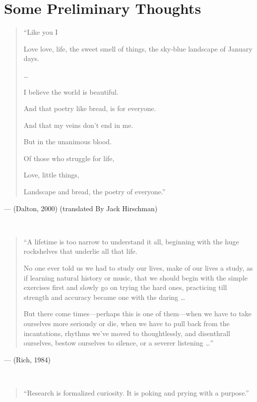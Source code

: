 \documentclass[
  letterpaper,
  DIV=11,
  numbers=noendperiod]{scrreprt}
\begin{document}

\hypertarget{some-preliminary-thoughts}{%
\chapter*{Some Preliminary Thoughts}\label{some-preliminary-thoughts}}


\begin{quote}
``Like you I

Love love, life, the sweet smell of things, the sky-blue landscape of
January days.

\ldots{}

I believe the world is beautiful.

And that poetry like bread, is for everyone.

And that my veins don't end in me.

But in the unanimous blood.

Of those who struggle for life,

Love, little things,

Landscape and bread, the poetry of everyone.''
\end{quote}

--- (Dalton, 2000) (translated By Jack Hirschman)

\(~\)

\begin{quote}
``A lifetime is too narrow to understand it all, beginning with the huge
rockshelves that underlie all that life.

No one ever told us we had to study our lives, make of our lives a
study, as if learning natural history or music, that we should begin
with the simple exercises first and slowly go on trying the hard ones,
practicing till strength and accuracy became one with the daring
\ldots{}

But there come times---perhaps this is one of them---when we have to
take ourselves more seriously or die, when we have to pull back from the
incantations, rhythms we've moved to thoughtlessly, and disenthrall
ourselves, bestow ourselves to silence, or a severer listening \ldots''
\end{quote}

--- (Rich, 1984)

\(~\)

\begin{quote}
``Research is formalized curiosity. It is poking and prying with a
purpose.''
\end{quote}
\end{document}
